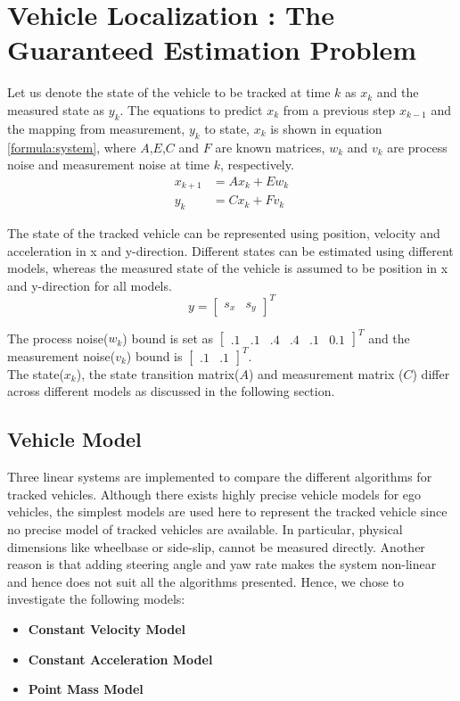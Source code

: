 \chapter{Vehicle Localization : The Guaranteed Estimation Problem} \label{ch:problem}
Let us denote the state of the vehicle to be tracked at time $k$ as $x_k$ and the measured state as $y_k$. The equations to predict $x_k$ from a previous step $x_{k-1}$ and the mapping from measurement, $y_k$ to state, $x_k$ is shown in equation \eqref{formula:system}, where $A$,$E$,$C$ and $F$ are known matrices, $w_k$ and $v_k$ are process noise and measurement noise at time $k$, respectively. 
\begin{equation}
\label{formula:system}
\begin{split}
x_{k+1} &= Ax_k + Ew_k\\
y_k &= Cx_k + Fv_k
\end{split}
\end{equation}

The state of the tracked vehicle can be represented using position, velocity and acceleration in x and y-direction. Different states can be estimated using different models, whereas the measured state of the vehicle is assumed to be position in x and y-direction for all models.
\begin{equation*}
y =[ 
\begin{matrix}
s_x & s_y
\end{matrix}
]^T
\end{equation*}

The process noise($w_k$) bound is set as $[\begin{matrix}
.1 & .1 & .4 & .4 & .1 & 0.1
\end{matrix}]^T$ and the measurement noise($v_k$) bound is  $[\begin{matrix}
.1 & .1
\end{matrix}]^T$.\\

The state($x_k$), the state transition matrix($A$) and measurement matrix ($C$) differ across different models as discussed in the following section.
\section{Vehicle Model}
Three linear systems are implemented to compare the different algorithms for tracked vehicles. Although there exists highly precise vehicle models for ego vehicles, the simplest models are used here to represent the tracked vehicle since no precise model of tracked vehicles are available. In particular, physical dimensions like wheelbase or side-slip, cannot be measured directly. Another reason is that adding steering angle and yaw rate makes the system non-linear and hence does not suit all the algorithms presented. Hence, we chose to investigate the following models:
\begin{itemize}
\item \textbf{Constant Velocity Model}
\item \textbf{Constant Acceleration Model}
\item \textbf{Point Mass Model}
\end{itemize}
